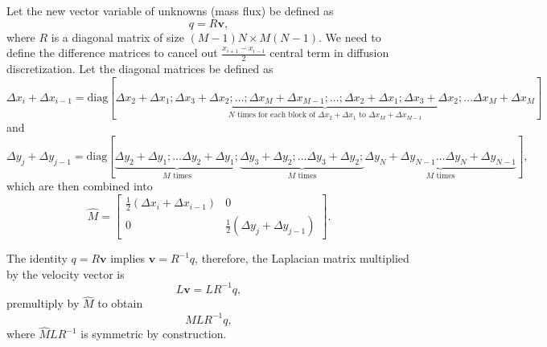 \documentclass{article}
\begin{document}
Let the new vector variable of unknowns (mass flux) be defined as
$${q} = R\boldsymbol{v},$$ 
where $R$ is a diagonal matrix of size $(M-1)N\times M(N-1)$. We need to define the difference matrices to cancel out $\frac{x_{i+1}-x_{i-1}}{2}$ central term in diffusion discretization. Let the diagonal matrices be defined as
\begin{equation*}
{\Delta x_i+\Delta x_{i-1}} = \text{diag}[\underbrace{\Delta x_2+\Delta x_1; \Delta x_3+\Delta x_2; \dotsc ;\Delta x_{M}+\Delta x_{M-1}; ...;\Delta x_2+\Delta x_1; \Delta x_3+\Delta x_2; \dotsc \Delta x_{M}+\Delta x_{M}}_{N\text{ times for each block of } \Delta x_2+\Delta x_1\text{ to }\Delta x_{M}+\Delta x_{M-1}}]
\end{equation*}
and
\begin{equation*}
{\Delta y_j+\Delta y_{j-1}} = \text{diag}[\underbrace{\Delta y_2+\Delta y_1;  \dotsc \Delta y_2+\Delta y_1;}_{M\text{ times}} \underbrace{\Delta y_3+\Delta y_2; \dotsc \Delta y_3+\Delta y_2;}_{M\text{ times}} \underbrace{\Delta y_N+\Delta y_{N-1}\dotsc \Delta y_N+\Delta y_{N-1}}_{M\text{ times}}],	
\end{equation*}
which are then combined into
\begin{equation*}
\hat{M} =\left[\begin{array}{cc}
\frac{1}{2}\left(\Delta x_i+\Delta x_{i-1}\right) & 0 \\
0 & \frac{1}{2}\left(\Delta y_j+\Delta y_{j-1}\right)
\end{array}\right].
\end{equation*}

The identity ${q}=R\boldsymbol{v}$ implies $\boldsymbol{v}=R^{-1}{q}$, therefore, the Laplacian matrix multiplied by the velocity vector is
$$L\boldsymbol{v}= LR^{-1}{q},$$ 
premultiply by $\hat M$ to obtain 
$$\hat MLR^{-1}{q},$$ 
where $\hat M L R^{-1}$ is symmetric by construction.  
\end{document}
